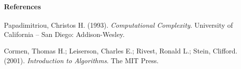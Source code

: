 \documentclass[thesis, landscape]{hmcposter}
\begin{document}
\paragraph{References}
\begin{enumerate*}[label=\textcolor{gray}{[\arabic*]}]
  \item Papadimitriou, Christos H. (1993). \textit{Computational Complexity}. University
    of California -- San Diego: Addison-Wesley.
  \item Cormen, Thomas H.; Leiserson, Charles E.; Rivest, Ronald L.; Stein, Clifford.
    (2001). \textit{Introduction to Algorithms}. The MIT Press.
\end{enumerate*}






%
%
\end{document}
